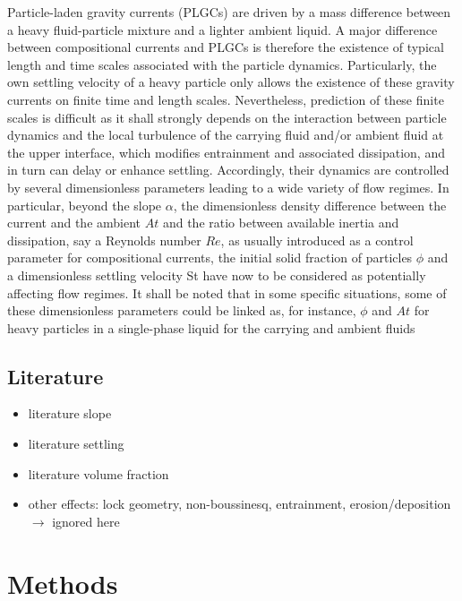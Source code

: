 \documentclass[twocolumn]{article}
\begin{document}
Particle-laden gravity currents (PLGCs) are driven by a mass difference between a heavy fluid-particle mixture and a lighter ambient liquid. A major difference between compositional currents and PLGCs is therefore the existence of typical length and time scales associated with the particle dynamics. Particularly, the own settling velocity of a heavy particle only allows the existence of these gravity currents on finite time and length scales. Nevertheless, prediction of these finite scales is difficult as it shall strongly depends on the interaction between particle dynamics and the local turbulence of the carrying fluid and/or ambient fluid at the upper interface, which modifies entrainment and associated dissipation, and in turn can delay or enhance settling. Accordingly, their dynamics are controlled by several dimensionless parameters leading to a wide variety of flow regimes. In particular, beyond the slope $\alpha$, the dimensionless density difference between the current and the ambient $At$ and the ratio between available inertia and dissipation, say a Reynolds number $Re$, as usually introduced as a control parameter for compositional currents, the initial solid fraction of particles $\phi$ and a dimensionless settling velocity St have now to be considered as potentially affecting flow regimes. It shall be noted that in some specific situations, some of these dimensionless parameters could be linked as, for instance, $\phi$ and $At$ for heavy particles in a single-phase liquid for the carrying and ambient fluids

\subsection{Literature}


\begin{itemize}
	\item literature slope
	\item literature settling
	\item literature volume fraction
	\item other effects: lock geometry, non-boussinesq, entrainment, erosion/deposition $\rightarrow$ ignored here
\end{itemize}

\section*{Methods}
\end{document}
